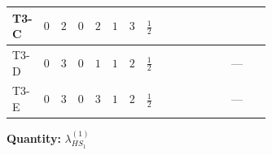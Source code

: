 \documentclass[8pt]{article}
\begin{document}
\begin{landscape}
\begin{longtable}{@{}llcccccc >{\raggedright\arraybackslash}p{0.21\linewidth} >{\raggedright\arraybackslash}p{0.21\linewidth} >{\raggedright\arraybackslash}p{0.21\linewidth}@{}}
\midrule
T3-C & $0$ & $2$ & $0$ & $2$ & $1$ & $3$ & $\frac{1}{2}$ & \scriptsize\adjustbox{max width=\linewidth}{$\begin{gathered} +4 {\lambda_{HS_1}^{(1)}}^2\end{gathered}$} & \scriptsize\adjustbox{max width=\linewidth}{$\begin{gathered} +6 {\lambda_{HS_1}^{(1)}} {\lambda_{S_1}^{(1)}}\end{gathered}$} & \scriptsize\adjustbox{max width=\linewidth}{$\begin{gathered} +\frac{9 {g_2}^4}{4}\end{gathered}$} \\
\midrule
T3-D & $0$ & $3$ & $0$ & $1$ & $1$ & $2$ & $\frac{1}{2}$ & \scriptsize\adjustbox{max width=\linewidth}{$\begin{gathered} +4 {\lambda_{HS_1}^{(1)}}^2\end{gathered}$} & \scriptsize\adjustbox{max width=\linewidth}{$\begin{gathered} +8 {\lambda_{HS_1}^{(1)}} {\lambda_{S_1}^{(1)}}\end{gathered}$} & --- \\
\midrule
T3-E & $0$ & $3$ & $0$ & $3$ & $1$ & $2$ & $\frac{1}{2}$ & \scriptsize\adjustbox{max width=\linewidth}{$\begin{gathered} +4 {\lambda_{HS_1}^{(1)}}^2\end{gathered}$} & \scriptsize\adjustbox{max width=\linewidth}{$\begin{gathered} +8 {\lambda_{HS_1}^{(1)}} {\lambda_{S_1}^{(1)}}\end{gathered}$} & --- \\
\midrule
\bottomrule
\end{longtable}
\clearpage
\noindent\textbf{Quantity: }$\lambda_{HS_1}^{(1)}$\par\smallskip

\end{landscape}
\end{document}
